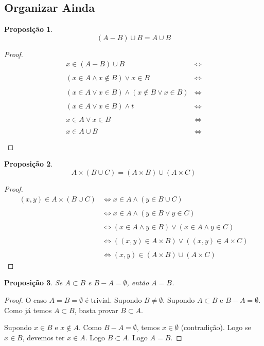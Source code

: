 \documentclass{article}
\newtheorem{prop}{Proposição}[section]
\theoremstyle{theorem}
\theoremstyle{lemma}
\theoremstyle{definition}
\theoremstyle{remark}
\begin{document}
\subsection{Organizar Ainda}
\begin{prop}
	$$(A-B)\cup B =  A\cup B$$
\end{prop}
\begin{proof}
	\begin{align*}
		x\in (A-B)\cup B &\iff \\~\\
		(x\in A \land x \not \in B) \lor x\in B &\iff \\~\\
		(x\in A\lor x\in B)  \land( x \not \in B \lor x\in B) &\iff \\~\\
		(x\in A\lor x\in B)  \land t &\iff \\~\\
		x\in A\lor x\in B &\iff \\~\\
		x \in A \cup B  &\iff \\~\\
	\end{align*}
\end{proof}
\begin{prop}
	$$A\times (B\cup C ) = (A\times B )\cup( A\times C)$$
\end{prop}
\begin{proof}
	\begin{align*}
		(x,y) \in A\times (B\cup C ) & \iff 
		x\in A \land (y\in B\cup C)  \\~\\ &\iff 
		x\in A \land (y\in B\lor y\in  C)  \\~\\& \iff
		(x\in A \land y\in B) \lor (x\in A \land y\in  C)  \\~\\& \iff
		((x,y)\in A\times B) \lor  ((x,y)\in  A\times C) \\~\\ & \iff
		(x,y)\in (A\times B) \cup  (A\times C)
	\end{align*}
\end{proof}
\begin{prop}
	Se $A\subset B$ e $B-A = \emptyset$, então $A = B$.
\end{prop}
\begin{proof}
	O caso $A = B  = \emptyset $ é trivial. Supondo $B \neq \emptyset$.
	Supondo $A\subset B$ e $B-A = \emptyset$. Como já temos $A\subset B$, basta provar $B \subset A$. 

	Supondo $x\in B$ e $x\not \in A$. Como $B-A = \emptyset$, temos $x\in \emptyset$ (contradição). Logo se $x\in B$, devemos ter $x\in A$. Logo $B \subset A$. Logo $A = B$.
\end{proof}
\end{document}
